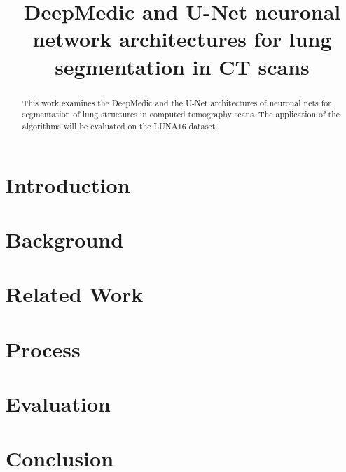 \documentclass[conference]{IEEEtran}
\begin{document}
\title{DeepMedic and U-Net neuronal network architectures for lung segmentation in CT scans}

\author{
	\and
	\and
	\and
}


\maketitle

\begin{abstract}
This work examines the DeepMedic and the U-Net architectures of neuronal nets for segmentation of lung structures in computed tomography scans. The application of the algorithms will be evaluated on the LUNA16 dataset.
\end{abstract}

\section{Introduction}



\section{Background}


\section{Related Work}


\section{Process}


\section{Evaluation}


\section{Conclusion}




\end{document}
